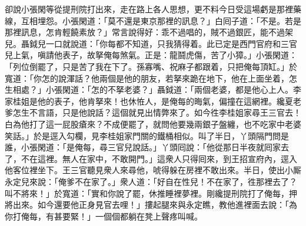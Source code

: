卻說小張閑等從提刑院打出來，走在路上各人思想，更不料今日受這場虧是那裡藥線，互相埋怨。小張閑道：「莫不還是東京那裡的訊息？」白囘子道：「不是。若是那裡訊息，怎肯輕饒素放？」常言說得好：乖不過唱的，賊不過銀匠，能不過架兒。{}聶鉞兒一口就說道：「你每都不知道，只我猜得着。此已定是西門官府和三官兒上氣，嗔請他表子，故拏俺每煞氣。正是：龍鬪虎傷，苦了小獐。」小張閑道：「列位倒罷了，只是苦了我在下了。孫寡嘴、祝麻子都跟着，只把俺每頂缸。」於寬道：「你怎的說渾話？他兩個是他的朋友，若拏來跪在地下，他在上面坐着，怎生相處？」小張閑道：「怎的不拏老婆？」聶鉞道：「兩個老婆，都是他心上人。李家桂姐是他的表子，他肯拏來！也休恠人，是俺每的晦氣，偏撞在這網裡。纔夏老爹怎生不言語，只是他說話？這個就見出情弊來了。如今徃李桂姐家尋王三官去！白為他打了這一屁股瘡來？不成便罷了，就問他要幾兩銀子盤纏，也不吃家中老婆笑話。」於是逕入勾欄，見李桂姐家門關的鐵桶相似。叫了半日，丫頭隔門問是誰，小張閑道：「是俺每，尋三官兒說話。」丫頭囘說：「他從那日半夜就囘家去了，不在這裡。無人在家中，不敢開門。」這衆人只得囘來，到王招宣府內，逕入他客位裡坐下。王三官聽見衆人來尋他，唬得躲在房裡不敢出來。半日，使出小厮永定兒來說：「俺爹不在家了。」衆人道：「好自在性兒！不在家了，徃那裡去了？叫不將來！」於寬道：「實和你說了罷，休推睡裡夢裡。剛纔提刑院打了俺每，押將出來。如今還要他正身見官去哩！」摟起腿來與永定瞧，教他進裡面去說：「為你打俺每，有甚要緊！」一個個都躺在凳上聲疼叫喊。

